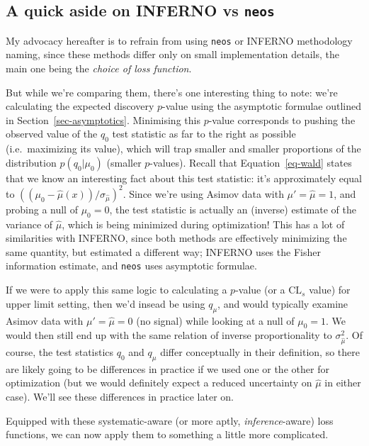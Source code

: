 \documentclass[
  11pt,
  numbers=noendperiod]{book}
\begin{document}
\hypertarget{a-quick-aside-on-inferno-vs-neos}{%
\subsection{\texorpdfstring{A quick aside on INFERNO vs
\texttt{neos}}{A quick aside on INFERNO vs neos}}\label{a-quick-aside-on-inferno-vs-neos}}

My advocacy hereafter is to refrain from using \texttt{neos} or INFERNO
methodology naming, since these methods differ only on small
implementation details, the main one being the \emph{choice of loss
function}.

But while we're comparing them, there's one interesting thing to note: we're calculating the expected discovery
\(p\)-value using the asymptotic formulae outlined in
Section~\ref{sec-asymptotics}. Minimising this \(p\)-value corresponds
to pushing the observed value of the \(q_0\) test statistic as far to
the right as possible (i.e.~maximizing its value), which will trap
smaller and smaller proportions of the distribution \(p(q_0 | \mu_0)\)
(smaller \(p\)-values). Recall that Equation~\ref{eq-wald} states that
we know an interesting fact about this test statistic: it's
approximately equal to
\(\left((\mu_0 - \hat{\mu}(x))/\sigma_{\hat{\mu}}\right)^2\). Since
we're using Asimov data with \(\mu'=\hat{\mu}=1\), and probing a null of
\(\mu_0=0\), the test statistic is actually an (inverse) estimate of the
variance of \(\hat{\mu}\), which is being minimized during optimization!
This has a lot of similarities with INFERNO, since both methods are
effectively minimizing the same quantity, but estimated a different way;
INFERNO uses the Fisher information estimate, and \texttt{neos} uses
asymptotic formulae.

If we were to apply this same logic to calculating a \(p\)-value (or a
\(\mathrm{CL}_s\) value) for upper limit setting, then we'd insead be
using \(q_\mu\), and would typically examine Asimov data with
\(\mu'=\hat{\mu}=0\) (no signal) while looking at a null of \(\mu_0=1\).
We would then still end up with the same relation of inverse
proportionality to \(\sigma_{\hat{\mu}}^2\). Of course, the test
statistics \(q_0\) and \(q_\mu\) differ conceptually in their
definition, so there are likely going to be differences in practice if
we used one or the other for optimization (but we would definitely
expect a reduced uncertainty on \(\hat{\mu}\) in either case). We'll see
these differences in practice later on.

Equipped with these systematic-aware (or more aptly,
\emph{inference}-aware) loss functions, we can now apply them to
something a little more complicated.
\end{document}
